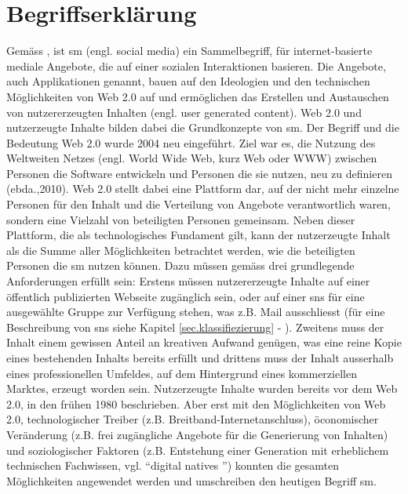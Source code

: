 \section{Begriffserklärung}\label{sec.begriff}
Gemäss , ist \gls{sm} (engl. social media) ein Sammelbegriff, für internet-basierte mediale Angebote, die auf einer sozialen Interaktionen basieren. Die Angebote, auch Applikationen genannt, bauen auf den Ideologien und den technischen Möglichkeiten von Web 2.0 auf \cite{Kaplan:2010} und ermöglichen das Erstellen und Austauschen von nutzererzeugten Inhalten (engl. user generated content).\newline
Web 2.0 und nutzerzeugte Inhalte bilden dabei die Grundkonzepte von \gls{sm}. Der Begriff und die Bedeutung Web 2.0 wurde 2004 neu eingeführt. Ziel war es, die Nutzung des Weltweiten Netzes (engl. World Wide Web, kurz Web oder WWW) zwischen Personen die Software entwickeln und Personen die sie nutzen, neu zu definieren (ebda.,2010). Web 2.0 stellt dabei eine Plattform dar, auf der nicht mehr einzelne Personen für den Inhalt und die Verteilung von Angebote verantwortlich waren, sondern eine Vielzahl von beteiligten Personen gemeinsam. Neben dieser Plattform, die als technologisches Fundament gilt, kann der nutzerzeugte Inhalt als die Summe aller Möglichkeiten betrachtet werden, wie die beteiligten Personen die \gls{sm} nutzen können. Dazu müssen gemäss  drei grundlegende Anforderungen erfüllt sein: Erstens müssen nutzererzeugte Inhalte auf einer öffentlich publizierten Webseite zugänglich sein, oder auf einer \gls{sns} für eine ausgewählte Gruppe zur Verfügung stehen, was z.B. Mail ausschliesst (für eine Beschreibung von \gls{sns} siehe Kapitel  \ref{sec.klassifiezierung} - ). Zweitens muss der Inhalt einem gewissen Anteil an kreativen Aufwand genügen, was eine reine Kopie eines bestehenden Inhalts bereits erfüllt und drittens muss der Inhalt ausserhalb eines professionellen Umfeldes, auf dem Hintergrund eines kommerziellen Marktes, erzeugt worden sein. Nutzerzeugte Inhalte wurden bereits vor dem Web 2.0, in den frühen 1980 beschrieben. Aber erst mit den Möglichkeiten von Web 2.0, technologischer Treiber (z.B. Breitband-Internetanschluss), öconomischer Veränderung (z.B. frei zugängliche Angebote für die Generierung von Inhalten) und soziologischer Faktoren (z.B. Entstehung einer Generation mit erheblichem technischen Fachwissen, vgl. \textquotedblleft digital natives \textquotedblright) konnten die gesamten Möglichkeiten angewendet werden und umschreiben den heutigen Begriff \gls{sm}.\newline 
